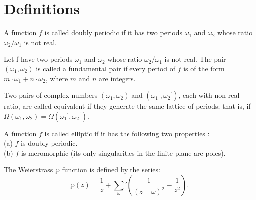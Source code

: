 \section{Definitions}

\begin{definition}
    A function $f$ is called doubly periodic if it has two periods $\omega_1$ and $\omega_2$ whose ratio
    $\omega_2 / \omega_1$ is not real.
\end{definition}

\begin{definition}
    Let f have two periods $\omega_1$ and $\omega_2$ whose ratio $\omega_2 / \omega_1$ is not real.
    The pair $(\omega_1, \omega_2)$ is called a fundamental pair if every
    period of $f$ is of the form $m \cdot \omega_1 + n \cdot \omega_2$, where $m$ and $n$ are integers.
\end{definition}

\begin{definition}
    Two pairs of complex numbers $(\omega_1, \omega_2)$ and $({\omega_1}^\prime, {\omega_2}^\prime)$, each with
    non-real ratio, are called equivalent if they generate the same lattice of periods; that is,
    if $\Omega(\omega_1, \omega_2) = \Omega({\omega_1}^\prime, {\omega_2}^\prime)$.
\end{definition}

\begin{definition}
    A function $f$ is called elliptic if it has the following two properties :\\
    (a) $f$ is doubly periodic.\\
    (b) $f$ is meromorphic (its only singularities in the finite plane are poles).
\end{definition}

\begin{definition}
    The Weierstrass $\wp$ function is defined by the series:
    \[
        \wp(z)= \frac{1}{z} + \sum_{\omega}{'} ( \frac{1}{(z - \omega)^2} - \frac{1}{z^2} ).
    \]
\end{definition}
